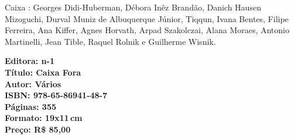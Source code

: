 \hspace*{-7cm}\hrulefill\hspace*{-7cm}

\medskip

\noindent{} Caixa : Georges Didi-Huberman, Débora Inêz Brandão, Danich Hausen Mizoguchi, Durval Muniz de Albuquerque Júnior, Tiqqun, Ivana Bentes, Filipe Ferreira, Ana Kiffer, Agnes Horvath, Arpad Szakolczai, Alana Moraes, Antonio Martinelli, Jean Tible, Raquel Rolnik e Guilherme Wisnik.

\vfill

\hspace*{-.4cm}\begin{minipage}[c]{.5\linewidth}
\small\textbf{
\hspace*{-.1cm}Editora: n-1\\
Título: Caixa Fora\\
Autor: Vários\\
ISBN: 978-65-86941-48-7\\
Páginas: 355\\
Formato: 19x11\,cm\\
Preço: R\$ 85,00\\
}
\end{minipage}

\pagebreak

\vspace*{1.5cm}


\bigskip

\hfill{}

\bigskip
\bigskip
\bigskip

